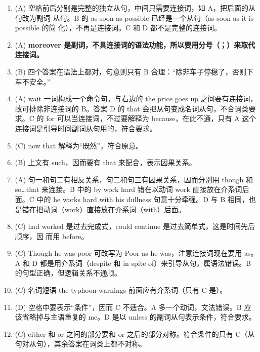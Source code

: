 \begin{enumerate}

\item (A) 空格前后分别是完整的独立从句，中间只需要连接词，如 A，把后面的从句改为副词
  从句。B 的 as soon as possible 已经是一个从句（as soon as it is possible 的简
  化），不再是连接词。C 和 D 都不是完整的连接词。

\item (A) \textbf{moreover 是副词，不具连接词的语法功能，所以要用分号（；）来取代连接词。}

\item (B) 四个答案在语法上都对，句意则只有 B 合理：“除非车子停稳了，否则下车不安全。”

\item (A) wait 一词构成一个命令句，与右边的 the price goes up 之间要有连接词，故可排除非连接词的 B。答案 D 的 that 会把从句变成名词从句，不合词类要求。C 的 for 可以当连接词，不过要解释为 because，在此不通，只有 A 这个连接词是引导时间副词从句用的，符合要求。

\item (C) now that 解释为“既然”，符合原意。

\item (B) 上文有 such，因而要有 that 来配合，表示因果关系。

\item (A) 句一和句二有相反关系，句二和句三有因果关系，因而分别用 though 和 so…that 来连接。B 中的 by work hard 错在以动词 work 直接放在介系词后面。C 中的 he works hard with his dullness 句意十分牵强。D 与 B 相同，也是错在把动词（work）直接放在介系词（with）后面。

\item (C) had worked 是过去完成式，could continue 是过去简单式，这是时间先后顺序，因
  而用 before。

\item  (C) Though he was poor 可改写为 Poor as he was，注意连接词现在要用 as。A 和 D 都是用介系词（despite 和 in spite of）来引导从句，属语法错误。B 的句型正确，但逻辑关系不通顺。

\item (C) 名词短语 the typhoon warnings 前面应有介系词（只有 C 是）。

\item  (D) 空格中要表示“条件”，因而 C 不适合。A 多一个动词，文法错误。B 应该省略掉与主语重复的 me。D 是以 unless 的副词从句表示条件，符合要求。

\item  (C) either 和 or 之间的部分要和 or 之后的部分对称。符合条件的只有 C（从句对从句），其余答案在词类上都不对称。


\end{enumerate}
